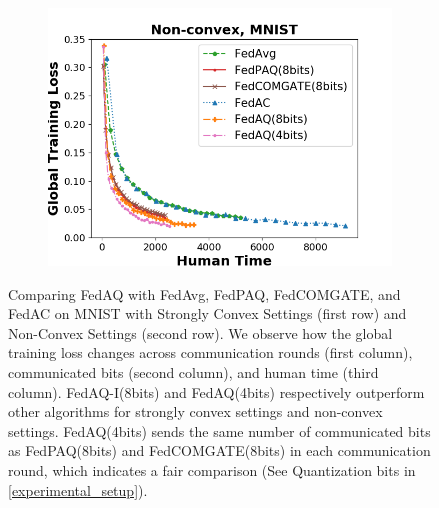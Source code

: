 \begin{figure}[!htbp]
\begin{subfigure}[b]{0.31\textwidth}
    \includegraphics[width=\textwidth]{figure/loss_iid_time_localstep_100_2.png}
    \end{subfigure}
    \caption{Comparing FedAQ with FedAvg, FedPAQ, FedCOMGATE, and FedAC on MNIST with Strongly Convex Settings (first row) and Non-Convex Settings (second row). We observe how the global training loss changes across communication rounds (first column), communicated bits (second column), and human time (third column). FedAQ-I(8bits) and FedAQ(4bits) respectively outperform other algorithms for strongly convex settings and non-convex settings. FedAQ(4bits) sends the same number of communicated bits as FedPAQ(8bits) and FedCOMGATE(8bits) in each communication round, which indicates a fair comparison (See Quantization bits in \cref{experimental_setup}).}
    \label{graph_in_main_body}
\end{figure}

